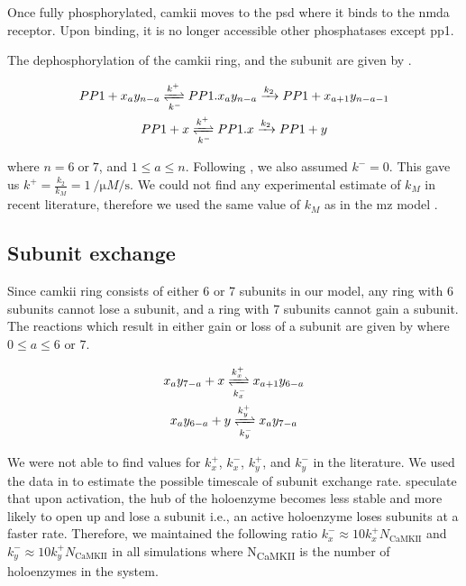 \documentclass[9pt,lineno,doublespacing]{elife}
\newcommand\SUB[2]{#1\textsubscript{#2}}
\begin{document}
{Once fully phosphorylated, \gls{camkii} moves to the \gls{psd} where it binds to
the \gls{nmda} receptor. Upon binding, it is no longer accessible other 
phosphatases except \gls{pp1}.

The dephosphorylation of the \gls{camkii} ring, and the subunit are given by
.

\begin{equation}\label{eq:dephosphorylation} 
    \begin{gathered} 
        PP1 + x_ay_{n-a} \xrightleftharpoons[k^-]{k^+} PP1.x_ay_{n-a} 
            \xrightarrow{k_2} PP1 + x_{a+1}y_{n-a-1} \\ 
        PP1 + x \xrightleftharpoons[k^-]{k^+} PP1.x \xrightarrow{k_2} PP1 + y 
    \end{gathered}
\end{equation}

\noindent where $n=6\;\text{or}\;7$, and $1\le a \le n$. Following
\cite{miller_stability_2005}, we also assumed $k^-=0$. This gave us
$k^+=\frac{k_2}{k_M}=\SI{1}{\per\micro M\per\second}$. We could not find any
experimental estimate of $k_M$ in recent literature, therefore we used the same
value of $k_M$ as in the \gls{mz} model \citep{miller_stability_2005}.

\subsection{Subunit exchange}\label{subunit exchange} 

Since \gls{camkii} ring consists of either 6 or 7 subunits in our model,
any ring with 6 subunits cannot lose a subunit, and a ring with 7 subunits
cannot gain a subunit. The reactions which result in either gain or loss of a
subunit are given by  where $0\le a \le 6\text{ or }7$.

\begin{equation}\label{eq:losegainx}
    \begin{gathered}
    x_ay_{7-a} + x \xrightleftharpoons[k^-_x]{k^+_x} x_{a+1}y_{6-a} \\
    x_ay_{6-a} + y \xrightleftharpoons[k^-_y]{k^+_y} x_{a}y_{7-a}
    \end{gathered}
\end{equation}

We were not able to find values for $k_x^+$, $k_x^-$, $k_y^+$, and $k_y^-$ in 
the literature. We used the data in
\cite{stratton_activation-triggered_2014} to estimate the possible timescale of
subunit exchange rate. \cite{bhattacharyya_molecular_2016} speculate that upon
activation, the hub of the holoenzyme becomes less stable and more likely to 
open up
and lose a subunit i.e., an active holoenzyme loses subunits at a faster rate. 
Therefore, we
maintained the following ratio \(k_x^- \approx 10 k_x^+ N_{\text{CaMKII}}\) and
\(k_y^- \approx 10 k_y^+ N_{\text{CaMKII}}\) in all simulations where
\SUB{N}{CaMKII} is the number of holoenzymes in the system.

}
\end{document}
